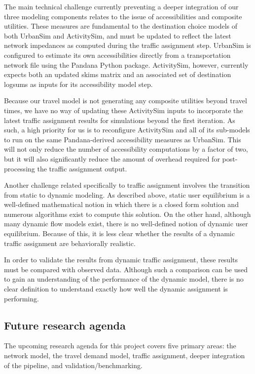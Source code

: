 The main technical challenge currently preventing a deeper integration of our three modeling components relates to the issue of accessibilities and composite utilities. These measures are fundamental to the destination choice models of both UrbanSim and ActivitySim, and must be updated to reflect the latest network impedances as computed during the traffic assignment step. UrbanSim is configured to estimate its own accessibilities directly from a transportation network file using the Pandana Python package. ActivitySim, however, currently expects both an updated skims matrix and an associated set of destination logsums as inputs for its accessibility model step.

Because our travel model is not generating any composite utilities beyond travel times, we have no way of updating these ActivitySim inputs to incorporate the latest traffic assignment results for simulations beyond the first iteration. As such, a high priority for us is to reconfigure ActivitySim and all of its sub-models to run on the same Pandana-derived accessibility measures as UrbanSim. This will not only reduce the number of accessibility computations by a factor of two, but it will also significantly reduce the amount of overhead required for post-processing the traffic assignment output.

Another challenge related specifically to traffic assignment involves the transition from static to dynamic modeling. As described above, static user equilibrium is a well-defined mathematical notion in which there is a closed form solution and numerous algorithms exist to compute this solution. On the other hand, although many dynamic flow models exist, there is no well-defined notion of dynamic user equilibrium. Because of this, it is less clear whether the results of a dynamic traffic assignment are behaviorally realistic.

In order to validate the results from dynamic traffic assignment, these results must be compared with observed data. Although such a comparison can be used to gain an understanding of the performance of the dynamic model, there is no clear definition to understand exactly how well the dynamic assignment is performing. 



\subsection{Future research agenda}

The upcoming research agenda for this project covers five primary areas: the network model, the travel demand model, traffic assignment, deeper integration of the pipeline, and validation/benchmarking.

